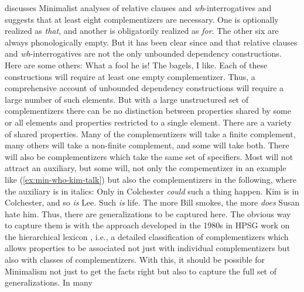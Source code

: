 \documentclass[output=paper
                ,modfonts
                ,nonflat
	        ,collection
	        ,collectionchapter
	        ,collectiontoclongg
 	        ,biblatex
                ,babelshorthands
                ,newtxmath
                ,draftmode
                ,colorlinks, citecolor=brown
]{./langsci/langscibook}
\begin{document}
\citet{Borsley2006a,Borsley2017a} discusses Minimalist analyses of relative clauses and \emph{wh}-interrogatives and suggests that at least eight complementizers are necessary. One is optionally realized as \emph{that}, and another is obligatorily realized as \emph{for}. The other six are always phonologically empty. But it has been clear since \citet{Ross67} and \citet{Chomsky77a-u} that relative clauses and \emph{wh}-interrogatives are not the only unbounded dependency constructions. Here are some others:
\eal
\settowidth{}
\ex What a fool he is!                          
\ex The bagels, I like.	                        
\zl 
Each of these constructions will require at least one empty complementizer. Thus, a comprehensive
account of unbounded dependency constructions will require a large number of such elements. 
But with a large unstructured set of complementizers there can be no distinction between properties
shared by some or all elements and properties restricted to a single element. There are a variety of shared properties. Many of the
complementizers will take a finite complement, many others will take a non-finite complement, and
some will take both. There will also be complementizers which take the same set of specifiers. Most
will not attract an auxiliary, but some will, not only the compementizer in an example like
(\ref{ex:min-who-kim-talk}) but also the complementizers in the following, where the auxiliary is in
italics: 
\eal
\ex Only in Colchester \emph{could} such a thing happen.
\ex Kim is in Colchester, and so \emph{is} Lee.
\ex Such \emph{is} life.
\ex The more Bill smokes, the more \emph{does} Susan hate him.
\zl
Thus, there are generalizations to be captured here. The obvious way to capture them is with the
approach developed in the 1980s in HPSG work on the hierarchical lexicon \citep*{FPW85a,Flickinger87}, i.e., a detailed
classification of complementizers which allows properties to be associated not just with individual
complementizers but also with classes of complementizers. With this, it should be possible for
Minimalism not just to get the facts right but also to capture the full set of generalizations. In many
\end{document}
